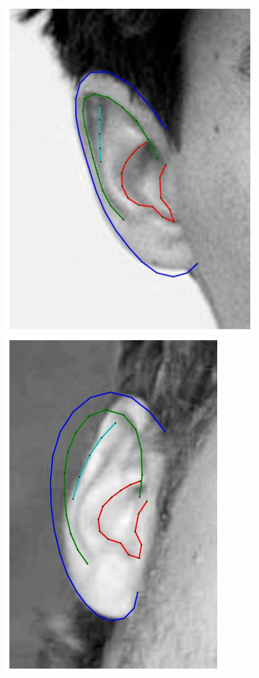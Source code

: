\begin{figure}[!t]
    \includegraphics[height=\flowhh]{resources/Ear_Deformable_Model/fittings/final_0020}
    \includegraphics[height=\flowhh]{resources/Ear_Deformable_Model/fittings/final_0026}
    

\end{figure}
